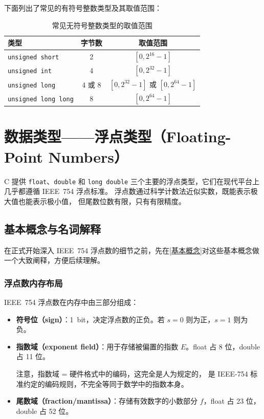 下面列出了常见的有符号整数类型及其取值范围：
\begin{table}[htbp]
\centering
\caption{常见无符号整数类型的取值范围}
\label{tab:unsigned-int-ranges}
\begin{tabular}{lcc}
  \toprule
  类型 & 字节数 & 取值范围 \\
  \midrule
  \texttt{unsigned short} & 2 & $[0, 2^{16}-1]$ \\
  \texttt{unsigned int} & 4 & $[0, 2^{32}-1]$ \\
  \texttt{unsigned long} & 4 或 8 & $[0, 2^{32}-1]$ 或 $[0, 2^{64}-1]$ \\
  \texttt{unsigned long long} & 8 & $[0, 2^{64}-1]$ \\
  \bottomrule
\end{tabular}
\end{table}

\newpage


\section{数据类型——浮点类型（Floating-Point Numbers）}

C 提供 \texttt{float}、\texttt{double} 和 \texttt{long double} 
三个主要的浮点类型，它们在现代平台上几乎都遵循 IEEE~754 浮点标准。
浮点数通过科学计数法近似实数，既能表示极大值也能表示极小值，
但尾数位数有限，只有有限精度。


\subsection{基本概念与名词解释}\label{基本概念}

在正式开始深入 IEEE~754 浮点数的细节之前，先在\autoref{基本概念}对这些基本概念做一个大致阐释，方便后续理解。
\subsubsection{浮点数内存布局}

IEEE~754 浮点数在内存中由三部分组成：
\begin{itemize}
    \item \textbf{符号位（sign）}：1~bit，决定浮点数的正负。若 $s=0$ 则为正，$s=1$ 则为负。
    \item \textbf{指数域（exponent field）}：用于存储被偏置的指数 $E$。float 占
     8 位，double 占 11 位。
     
     注意，指数域 = 硬件格式中的编码，这完全是人为规定的，
     是 IEEE-754 标准约定的编码规则，不完全等同于数学中的指数本身。
    \item \textbf{尾数域（fraction/mantissa）}：存储有效数字的小数部分 $f$，float 占 23 位，double 占 52 位。
\end{itemize}

